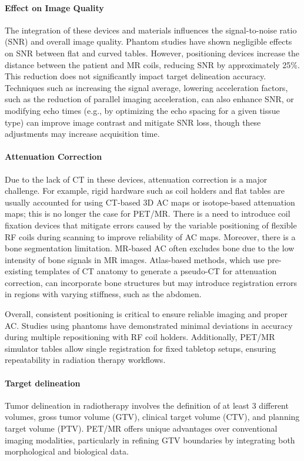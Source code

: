 \begin{multicols}{2}
\paragraph{Effect on Image Quality}
The integration of these devices and materials influences the signal-to-noise ratio (SNR) and overall image quality. Phantom studies have shown negligible effects on SNR between flat and curved tables. However, positioning devices increase the distance between the patient and MR coils, reducing SNR by approximately 25\%. This reduction does not significantly impact target delineation accuracy. Techniques such as increasing the signal average, lowering acceleration factors, such as the reduction of parallel imaging acceleration, can also enhance SNR, or modifying echo times (e.g., by optimizing the echo spacing for a given tissue type) can improve image contrast and mitigate SNR loss, though these adjustments may increase acquisition time. \cite{yan2024,Rostami2024}

\paragraph{Attenuation Correction}
Due to the lack of CT in these devices, attenuation correction is a major challenge. For example, rigid hardware such as coil holders and flat tables are usually accounted for using CT-based 3D AC maps or isotope-based attenuation maps; this is no longer the case for PET/MR. There is a need to introduce coil fixation devices that mitigate errors caused by the variable positioning of flexible RF coils during scanning to improve reliability of AC maps. Moreover, there is a bone segmentation limitation. MR-based AC often excludes bone due to the low intensity of bone signals in MR images. Atlas-based methods, which use pre-existing templates of CT anatomy to generate a pseudo-CT for attenuation correction, can incorporate bone structures but may introduce registration errors in regions with varying stiffness, such as the abdomen.

Overall, consistent positioning is critical to ensure reliable imaging and proper AC. Studies using phantoms have demonstrated minimal deviations in accuracy during multiple repositioning with RF coil holders. Additionally, PET/MR simulator tables allow single registration for fixed tabletop setups, ensuring repeatability in radiation therapy workflows.

\paragraph{Target delineation}
Tumor delineation in radiotherapy involves the definition of at least 3 different volumes, gross tumor volume (GTV), clinical target volume (CTV), and planning target volume (PTV). PET/MR offers unique advantages over conventional imaging modalities, particularly in refining GTV boundaries by integrating both morphological and biological data.



\end{multicols}
